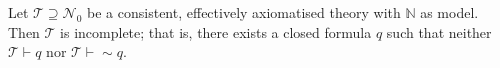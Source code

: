 Let $\mathcal{T} \supseteq \mathcal{N}_0$ be a consistent, effectively axiomatised theory with $\mathbb{N}$ as model. Then $\mathcal{T}$ is incomplete; that is, there exists a closed formula $q$ such that neither $\mathcal{T} \vdash q$ nor $\mathcal{T} \vdash \sim q$.
